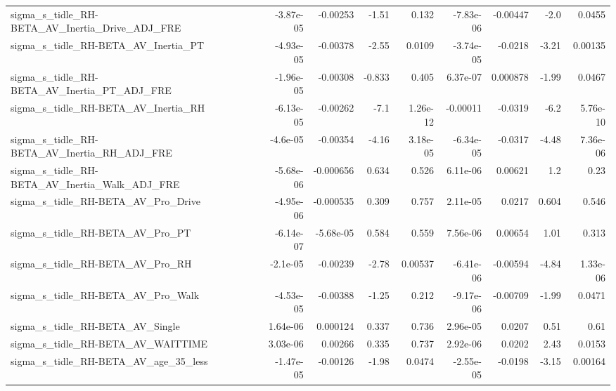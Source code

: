 \begin{tabular}{lrrrrrrrr}
sigma\_s\_tidle\_RH-BETA\_AV\_Inertia\_Drive\_ADJ\_FRE     &   -3.87e-05 &     -0.00253 &    -1.51 &    0.132 &  -7.83e-06 &    -0.00447 &         -2.0 &        0.0455 \\
sigma\_s\_tidle\_RH-BETA\_AV\_Inertia\_PT                &   -4.93e-05 &     -0.00378 &    -2.55 &   0.0109 &  -3.74e-05 &     -0.0218 &        -3.21 &       0.00135 \\
sigma\_s\_tidle\_RH-BETA\_AV\_Inertia\_PT\_ADJ\_FRE        &   -1.96e-05 &     -0.00308 &   -0.833 &    0.405 &   6.37e-07 &    0.000878 &        -1.99 &        0.0467 \\
sigma\_s\_tidle\_RH-BETA\_AV\_Inertia\_RH                &   -6.13e-05 &     -0.00262 &     -7.1 & 1.26e-12 &   -0.00011 &     -0.0319 &         -6.2 &      5.76e-10 \\
sigma\_s\_tidle\_RH-BETA\_AV\_Inertia\_RH\_ADJ\_FRE        &    -4.6e-05 &     -0.00354 &    -4.16 & 3.18e-05 &  -6.34e-05 &     -0.0317 &        -4.48 &      7.36e-06 \\
sigma\_s\_tidle\_RH-BETA\_AV\_Inertia\_Walk\_ADJ\_FRE      &   -5.68e-06 &    -0.000656 &    0.634 &    0.526 &   6.11e-06 &     0.00621 &          1.2 &          0.23 \\
sigma\_s\_tidle\_RH-BETA\_AV\_Pro\_Drive                 &   -4.95e-06 &    -0.000535 &    0.309 &    0.757 &   2.11e-05 &      0.0217 &        0.604 &         0.546 \\
sigma\_s\_tidle\_RH-BETA\_AV\_Pro\_PT                    &   -6.14e-07 &    -5.68e-05 &    0.584 &    0.559 &   7.56e-06 &     0.00654 &         1.01 &         0.313 \\
sigma\_s\_tidle\_RH-BETA\_AV\_Pro\_RH                    &    -2.1e-05 &     -0.00239 &    -2.78 &  0.00537 &  -6.41e-06 &    -0.00594 &        -4.84 &      1.33e-06 \\
sigma\_s\_tidle\_RH-BETA\_AV\_Pro\_Walk                  &   -4.53e-05 &     -0.00388 &    -1.25 &    0.212 &  -9.17e-06 &    -0.00709 &        -1.99 &        0.0471 \\
sigma\_s\_tidle\_RH-BETA\_AV\_Single                    &    1.64e-06 &     0.000124 &    0.337 &    0.736 &   2.96e-05 &      0.0207 &         0.51 &          0.61 \\
sigma\_s\_tidle\_RH-BETA\_AV\_WAITTIME                  &    3.03e-06 &      0.00266 &    0.335 &    0.737 &   2.92e-06 &      0.0202 &         2.43 &        0.0153 \\
sigma\_s\_tidle\_RH-BETA\_AV\_age\_35\_less               &   -1.47e-05 &     -0.00126 &    -1.98 &   0.0474 &  -2.55e-05 &     -0.0198 &        -3.15 &       0.00164 \\

\end{tabular}
